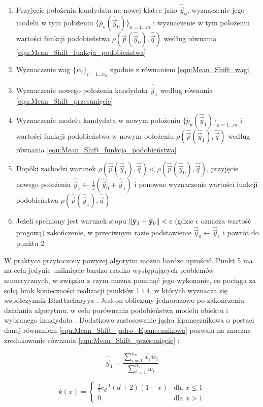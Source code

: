 \begin{enumerate}
	\item Przyjęcie położenia kandydata na nowej klatce jako $\hat{\vec{y}}_0$, wyznaczenie jego modelu w tym położeniu $\{\hat{p}_u(\hat{\vec{y}}_0)\}_{u = 1 \dots m}$ i wyznaczenie w tym położeniu wartości funkcji podobieństwa $\rho(\hat{\vec{p}}(\hat{\vec{y}}_0), \hat{\vec{q}})$ według równania \ref{equ:Mean_Shift_funkcja_podobieństwa}
	\item Wyznaczenie wag $\{w_i\}_{i=1 \dots n_h}$ zgodnie z równaniem \ref{equ:Mean_Shift_wagi}
	\item Wyznaczenie nowego położenia kandydata $\hat{\vec{y}}_1$ według równania \ref{equ:Mean_Shift_przesunięcie}
	\item Wyznaczenie modelu kandydata w nowym położeniu $\{\hat{p}_u(\hat{\vec{y}}_1)\}_{u = 1 \dots m}$ i wartości funkcji podobieństwa w nowym położeniu $\rho(\hat{\vec{p}}(\hat{\vec{y}}_1), \hat{\vec{q}})$ według równania \ref{equ:Mean_Shift_funkcja_podobieństwa}
	\item Dopóki zachodzi warunek $\rho(\hat{\vec{p}}(\hat{\vec{y}}_1), \hat{\vec{q}}) < \rho(\hat{\vec{p}}(\hat{\vec{y}}_0), \hat{\vec{q}})$, przyjęcie nowego położenia $\hat{\vec{y}}_1 \leftarrow \frac{1}{2}(\hat{\vec{y}}_0 + \hat{\vec{y}}_1)$ i ponowne wyznaczenie wartości funkcji podobieństwa $\rho(\hat{\vec{p}}(\hat{\vec{y}}_1), \hat{\vec{q}})$
	\item Jeżeli spełniony jest warunek stopu $\lVert\hat{\mathbf{y}}_1 - \hat{\mathbf{y}}_0\rVert < \epsilon$ (gdzie $\epsilon$ oznacza wartość progową) zakończenie, w przeciwnym razie podstawienie $\hat{\vec{y}}_0 \leftarrow \hat{\vec{y}}_1$ i powrót do punktu 2
\end{enumerate}

W praktyce przytoczony powyżej algorytm można bardzo uprościć. Punkt 5 ma na celu jedynie uniknięcie bardzo rzadko występujących problemów numerycznych, w związku z czym można pominąć jego wykonanie, co pociąga za sobą brak konieczności realizacji punktów 1 i 4, w których wyznacza się współczynnik Bhattacharyya \cite{Comaniciu2003}. Jest on obliczany jednorazowo po zakończeniu działania algorytmu, w celu porównania podobieństwa modelu obiektu i wybranego kandydata \cite{Comaniciu2003}. Dodatkowo zastosowanie jądra Epanecznikowa o postaci danej równaniem \ref{equ:Mean_Shift_jadro_Epanecznikowa} pozwala na znaczne zredukowanie równania \ref{equ:Mean_Shift_przesunięcie} \cite{Comaniciu2003}:

\begin{equation}
\label{equ:Mean_Shift_przesunięcie_zredukowane}
	\hat{\vec{y}}_1 = \frac{\sum_{i=1}^{n_h}\vec{x}_i w_i}{\sum_{i=1}^{n_h} w_i}
\end{equation}

\begin{equation}
\label{equ:Mean_Shift_jadro_Epanecznikowa}
	k(x) = 
	\begin{cases}
		\frac{1}{2}c_d^{-1}(d+2)(1-x) & \text{dla } x \leq 1 \\
		0 & \text{dla } x > 1
	\end{cases}
\end{equation}
